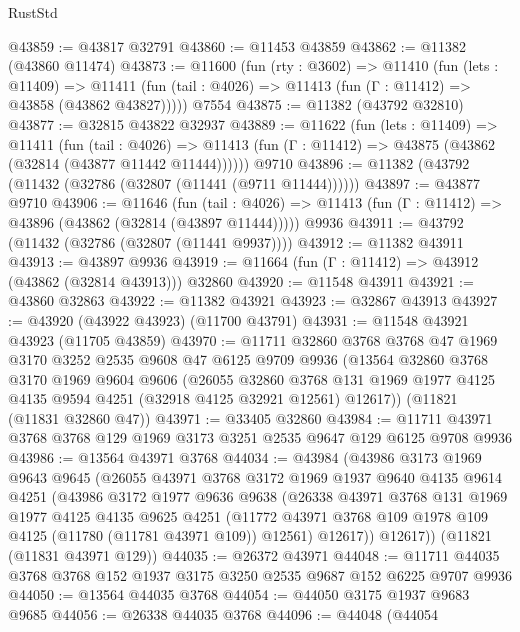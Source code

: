 \begin{lexlean}{RustStd}
\begin{coremodule}
@43859 := @43817 @32791
@43860 := @11453 @43859
@43862 := @11382 (@43860 @11474)
@43873 := @11600
    (fun (rty : @3602) =>
    @11410
      (fun (lets : @11409) =>
      @11411 (fun (tail : @4026) => @11413 (fun (Γ : @11412) => @43858 (@43862 @43827)))))
    @7554
@43875 := @11382 (@43792 @32810)
@43877 := @32815 @43822 @32937
@43889 := @11622
    (fun (lets : @11409) =>
    @11411
      (fun (tail : @4026) =>
      @11413 (fun (Γ : @11412) => @43875 (@43862 (@32814 (@43877 @11442 @11444))))))
    @9710
@43896 := @11382 (@43792 (@11432 (@32786 (@32807 (@11441 (@9711 @11444))))))
@43897 := @43877 @9710
@43906 := @11646
    (fun (tail : @4026) => @11413 (fun (Γ : @11412) => @43896 (@43862 (@32814 (@43897 @11444)))))
    @9936
@43911 := @43792 (@11432 (@32786 (@32807 (@11441 @9937))))
@43912 := @11382 @43911
@43913 := @43897 @9936
@43919 := @11664 (fun (Γ : @11412) => @43912 (@43862 (@32814 @43913))) @32860
@43920 := @11548 @43911
@43921 := @43860 @32863
@43922 := @11382 @43921
@43923 := @32867 @43913
@43927 := @43920 (@43922 @43923) (@11700 @43791)
@43931 := @11548 @43921 @43923 (@11705 @43859)
@43970 := @11711
    @32860
    @3768
    @3768
    @47
    @1969
    @3170
    @3252
    @2535
    @9608
    @47
    @6125
    @9709
    @9936
    (@13564
      @32860
      @3768
      @3170
      @1969
      @9604
      @9606
      (@26055
        @32860
        @3768
        @131
        @1969
        @1977
        @4125
        @4135
        @9594
        @4251
        (@32918 @4125 @32921 @12561)
        @12617))
    (@11821 (@11831 @32860 @47))
@43971 := @33405 @32860
@43984 := @11711 @43971 @3768 @3768 @129 @1969 @3173 @3251 @2535 @9647 @129 @6125 @9708 @9936
@43986 := @13564 @43971 @3768
@44034 := @43984
    (@43986
      @3173
      @1969
      @9643
      @9645
      (@26055
        @43971
        @3768
        @3172
        @1969
        @1937
        @9640
        @4135
        @9614
        @4251
        (@43986
          @3172
          @1977
          @9636
          @9638
          (@26338
            @43971
            @3768
            @131
            @1969
            @1977
            @4125
            @4135
            @9625
            @4251
            (@11772 @43971 @3768 @109 @1978 @109 @4125 (@11780 (@11781 @43971 @109)) @12561)
            @12617))
        @12617))
    (@11821 (@11831 @43971 @129))
@44035 := @26372 @43971
@44048 := @11711 @44035 @3768 @3768 @152 @1937 @3175 @3250 @2535 @9687 @152 @6225 @9707 @9936
@44050 := @13564 @44035 @3768
@44054 := @44050 @3175 @1937 @9683 @9685
@44056 := @26338 @44035 @3768
@44096 := @44048
    (@44054

\end{coremodule}
\end{lexlean}
